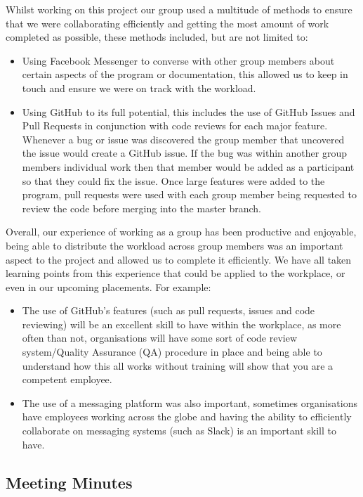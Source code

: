 \documentclass[
  english,
  a4paper,
,tablecaptionabove
]{scrartcl}
\providecommand{\tightlist}{%
  \setlength{\itemsep}{0pt}\setlength{\parskip}{0pt}}
\begin{document}
Whilst working on this project our group used a multitude of methods to
ensure that we were collaborating efficiently and getting the most
amount of work completed as possible, these methods included, but are
not limited to:

\begin{itemize}
\tightlist
\item
  Using Facebook Messenger to converse with other group members about
  certain aspects of the program or documentation, this allowed us to
  keep in touch and ensure we were on track with the workload.
\item
  Using GitHub to its full potential, this includes the use of GitHub
  Issues and Pull Requests in conjunction with code reviews for each
  major feature. Whenever a bug or issue was discovered the group member
  that uncovered the issue would create a GitHub issue. If the bug was
  within another group members individual work then that member would be
  added as a participant so that they could fix the issue. Once large
  features were added to the program, pull requests were used with each
  group member being requested to review the code before merging into
  the master branch.
\end{itemize}

Overall, our experience of working as a group has been productive and
enjoyable, being able to distribute the workload across group members
was an important aspect to the project and allowed us to complete it
efficiently. We have all taken learning points from this experience that
could be applied to the workplace, or even in our upcoming placements.
For example:

\begin{itemize}
\tightlist
\item
  The use of GitHub's features (such as pull requests, issues and code
  reviewing) will be an excellent skill to have within the workplace, as
  more often than not, organisations will have some sort of code review
  system/Quality Assurance (QA) procedure in place and being able to
  understand how this all works without training will show that you are
  a competent employee.
\item
  The use of a messaging platform was also important, sometimes
  organisations have employees working across the globe and having the
  ability to efficiently collaborate on messaging systems (such as
  Slack) is an important skill to have.
\end{itemize}

\hypertarget{meeting-minutes}{%
\subsection{Meeting Minutes}\label{meeting-minutes}}
\end{document}
